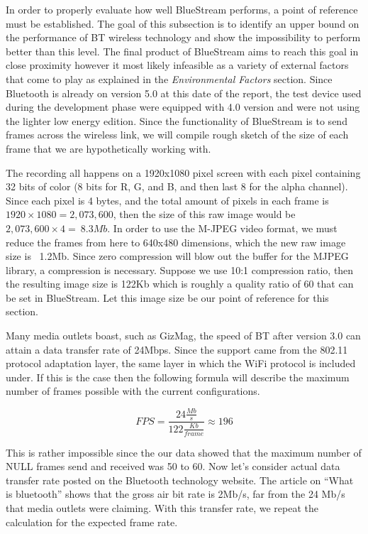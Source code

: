 \documentclass[a4paper,12pt]{article}
\begin{document}
In order to properly evaluate how well BlueStream performs, a point of reference must be established. The goal of this subsection is to identify an upper bound on the performance of BT wireless technology and show the impossibility to perform better than this level. The final product of BlueStream aims to reach this goal in close proximity however it most likely infeasible as a variety of external factors that come to play as explained in the \textit{Environmental Factors} section. Since Bluetooth is already on version 5.0 at this date of the report, the test device used during the development phase were equipped with 4.0 version and were not using the lighter low energy edition. Since the functionality of BlueStream is to send frames across the wireless link, we will compile rough sketch of the size of each frame that we are hypothetically working with.

The recording all happens on a 1920x1080 pixel screen with each pixel containing 32 bits of color (8 bits for R, G, and B, and then last 8 for the alpha channel). Since each pixel is 4 bytes, and the total amount of pixels in each frame is $1920\times 1080 = 2,073,600$, then the size of this raw image would be$ 2,073,600\times 4 = ~8.3Mb$. In order to use the M-JPEG video format, we must reduce the frames from here to 640x480 dimensions, which the new raw image size is ~1.2Mb. Since zero compression will blow out the buffer for the MJPEG library, a compression is necessary. Suppose we use 10:1 compression ratio, then the resulting image size is 122Kb which is roughly a quality ratio of 60 that can be set in BlueStream. Let this image size be our point of reference for this section.

Many media outlets boast, such as GizMag, the speed of BT after version 3.0 can attain a data transfer rate of 24Mbps\cite{GizMag}. Since the support came from the 802.11 protocol adaptation layer, the same layer in which the WiFi protocol is included under. If this is the case then the following formula will describe the maximum number of frames possible with the current configurations.

$$FPS = \frac{24\frac{Mb}{s}}{122\frac{Kb}{frame}} \approx 196$$

This is rather impossible since the our data showed that the maximum number of NULL frames send and received was 50 to 60. Now let’s consider actual data transfer rate posted on the Bluetooth technology website. The article on “What is bluetooth” shows that the gross air bit rate is 2Mb/s, far from the 24 Mb/s that media outlets were claiming. With this transfer rate, we repeat the calculation for the expected frame rate\cite{BTSpecs}.
\end{document}
